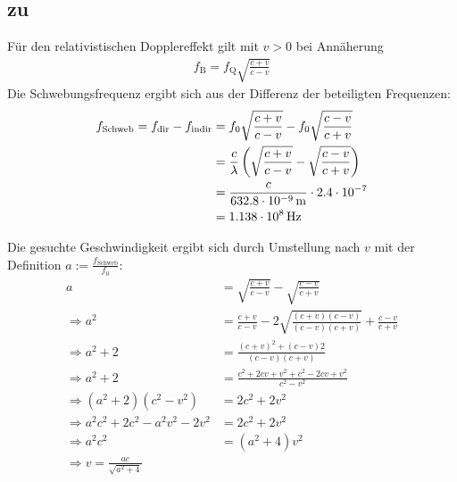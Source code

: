 \documentclass[a4paper]{scrartcl}
\begin{document}
\subsection{zu }
\label{lsg:Doppler}

Für den relativistischen Dopplereffekt gilt mit $v>0$ bei Annäherung
\begin{align*}
  f_\text{B} = f_\text{Q} \sqrt{\frac{c+v}{c-v}}
\end{align*}
Die Schwebungsfrequenz ergibt sich aus der Differenz der beteiligten Frequenzen:
\begin{align*}
  f_\text{Schweb} = f_\text{dir} - f_\text{indir} & = f_0\sqrt{\frac{c+v}{c-v}} - f_0\sqrt{\frac{c-v}{c+v}}\\
  &= \frac{c}{\lambda} \left( \sqrt{\frac{c+v}{c-v}} - \sqrt{\frac{c-v}{c+v}} \right)\\
  &= \frac{c}{\unit[632.8\cdot 10^{-9}]{m}} \cdot 2.4\cdot 10^{-7}\\
  &= \unit[1.138 \cdot 10^8]{Hz}
\end{align*}

Die gesuchte Geschwindigkeit ergibt sich durch Umstellung nach $v$ mit der Definition $a := \frac{f_\text{Schweb}}{f_0}$:
\begin{align*}
  a & = \sqrt{\frac{c+v}{c-v}} - \sqrt{\frac{c-v}{c+v}} \\
  \Rightarrow a^2 & = \frac{c+v}{c-v} - 2\sqrt{\frac{(c+v)(c-v)}{(c-v)(c+v)}} + \frac{c-v}{c+v} \\
  \Rightarrow a^2 + 2 & = \frac{(c+ v)^2 + (c-v)2}{(c-v)(c+v)}\\
  \Rightarrow a^2 + 2 & = \frac{c^2 + 2cv + v^2 + c^2 - 2cv + v^2}{c^2 - v^2}\\
  \Rightarrow (a^2 + 2)(c^2-v^2) &= 2c^2 + 2v^2\\
  \Rightarrow a^2c^2 + 2c^2 - a^2v^2 - 2v^2 & = 2c^2 + 2v^2\\
  \Rightarrow a^2c^2 & = (a^2+4)v^2\\
  \Rightarrow v = \frac{ac}{\sqrt{a^2+4}}
\end{align*}
\end{document}
